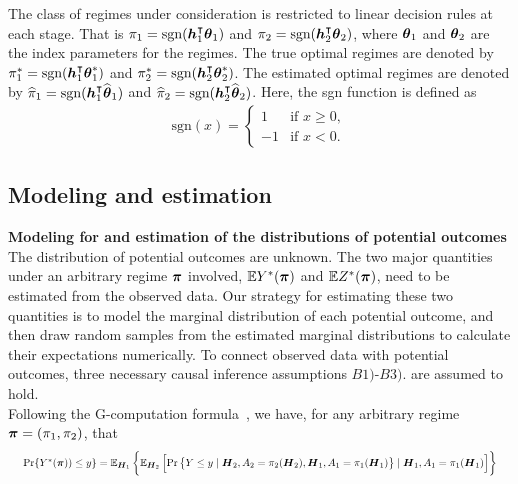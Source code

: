 The class of regimes under consideration is restricted to linear decision rules at each stage. That is $\pi_1 = \text{sgn}(\boldsymbol{h}_1^{\intercal}\boldsymbol{\theta}_1)$ and  $\pi_2 = \text{sgn}(\boldsymbol{h}_2^{\intercal}\boldsymbol{\theta}_2)$, where $\boldsymbol{\theta}_1$ and $\boldsymbol{\theta}_2$ are the index parameters for the regimes. The true optimal regimes are denoted by $\pi^{*}_1 = \text{sgn}(\boldsymbol{h}_1^{\intercal}\boldsymbol{\theta}^{*}_1)$ and  $\pi^{*}_2 = \text{sgn}(\boldsymbol{h}_2^{\intercal}\boldsymbol{\theta}^{*}_2)$. The estimated optimal regimes are denoted by $\widehat{\pi}_1 = \text{sgn}(\boldsymbol{h}_1^{\intercal}\widehat{\boldsymbol{\theta}}_1)$ and  $\widehat{\pi}_2 = \text{sgn}(\boldsymbol{h}_2^{\intercal}\widehat{\boldsymbol{\theta}}_2)$. Here, the sgn function is defined as
 \begin{gather*}
\text{sgn}(x)=\begin{cases}
1 & \mbox{if }x\ge0,\\
-1 & \mbox{if }x<0.
\end{cases}
\end{gather*}
\subsection{Modeling and estimation}
\textbf{Modeling for and estimation of the distributions of potential outcomes}\\
The distribution of potential outcomes are unknown. The two major quantities under an arbitrary regime $\boldsymbol{\pi}$ involved, $\mathbb{E}Y^*(\boldsymbol{\pi})$ and $\mathbb{E}Z^*(\boldsymbol{\pi})$, need to be estimated from the observed data. Our strategy for estimating these two quantities is to model the marginal distribution of each potential outcome, and then draw random samples from the estimated marginal distributions to calculate their expectations numerically. To connect observed data with potential outcomes, three necessary causal inference assumptions $\textit{B1)-B3).}$ are assumed to hold. \\

Following the G-computation formula~\cite{Gill2001}, we have, for any arbitrary regime $\boldsymbol{\pi} = (\pi_1, \pi_2) $, that
\begin{equation*}	
\resizebox{\textwidth}{!}{
$\text{Pr}\{ Y^*(\bs{\pi})) \le y\} = \mb{E}_{\bs{H}_1} \lt\{ \mb{E}_{\bs{H}_2}\lt[ \text{Pr}\lt\{Y \le y \mid \bs{H}_2 , A_2 = \pi_2(\bs{H}_2), \bs{H}_1 , A_1 = \pi_1(\bs{H}_1)\rt\}  \mid \bs{H}_1, A_1 = \pi_1(\bs{H}_1) \rt] \rt\}$
}
\end{equation*}


